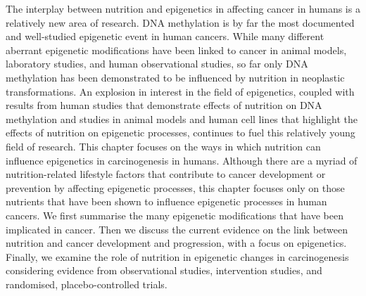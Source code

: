 \noindent The interplay between nutrition and epigenetics in affecting cancer in humans is a relatively new area of research. DNA methylation is by far the most documented and well-studied epigenetic event in human cancers. While many different aberrant epigenetic modifications have been linked to cancer in animal models, laboratory studies, and human observational studies, so far only DNA methylation has been demonstrated to be influenced by nutrition in neoplastic transformations. An explosion in interest in the field of epigenetics, coupled with results from human studies that demonstrate effects of nutrition on DNA methylation and studies in animal models and human cell lines that highlight the effects of nutrition on epigenetic processes, continues to fuel this relatively young field of research. This chapter focuses on the ways in which nutrition can influence epigenetics in carcinogenesis in humans. Although there are a myriad of nutrition-related lifestyle factors that contribute to cancer 
development or prevention by affecting epigenetic processes, this chapter focuses only on those nutrients that have been shown to influence epigenetic processes in human cancers. We first summarise the many epigenetic modifications that have been implicated in cancer. Then we discuss the current evidence on the link between nutrition and cancer development and progression, with a focus on epigenetics. Finally, we examine the role of nutrition in epigenetic changes in carcinogenesis considering evidence from observational studies, intervention studies, and randomised, placebo-controlled trials. 
 
